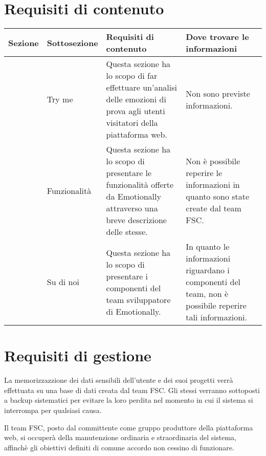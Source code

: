 \section{Requisiti di contenuto}\label{sec:requisiti-di-contenuto}
\begin{table}[H]
	\centering
	\caption{Contenuti di Emotionally.}
	\label{tab:bisogni-utenti}
	\begin{longtable}{@{}|>{\centering\arraybackslash}m{}|m{}|m{}|>{\centering\arraybackslash}m{}|@{}}
		\hline
		\rowcolor{emotionally-color!35}
		{\textbf{Sezione}}   & {\textbf{Sottosezione}}     & {\textbf{Requisiti di 
		contenuto}} & {\textbf{Dove trovare le informazioni}} 
		\\\hline
		\endfirsthead
		\cellcolor{white!0}  & Try me & Questa sezione ha lo scopo di far 
		effettuare un'analisi delle emozioni di prova agli utenti visitatori 
		della piattaforma web. & Non sono previste informazioni. \\
		\cellcolor{white!0}  & Funzionalità & Questa sezione ha lo scopo di 
		presentare 
		le funzionalità offerte da Emotionally attraverso una breve descrizione 
		delle stesse. & Non è possibile reperire le informazioni in quanto sono 
		state create dal team FSC.\\
		\multirow{-2}{*}{Landing page} & Su di noi & Questa sezione ha lo scopo 
		di 
		presentare i componenti del team sviluppatore di Emotionally. & In 
		quanto le informazioni riguardano i componenti del team, non è 
		possibile reperire tali informazioni. \\		
		\hline
	\end{longtable}
\end{table}

\section{Requisiti di gestione}\label{sec:requisiti-di-gestione}
La memorizzazzione dei dati sensibili dell'utente e dei suoi progetti verrà 
effettuata su una base di dati creata dal team FSC. Gli stessi verranno 
sottoposti a backup sistematici per evitare la loro perdita nel momento in cui 
il sistema si interrompa per qualsiasi causa.

Il team FSC, posto dal committente come gruppo produttore della piattaforma 
web, si occuperà della manutenzione ordinaria e straordinaria del sistema, 
affinchè gli obiettivi definiti di comune accordo non cessino di funzionare.

